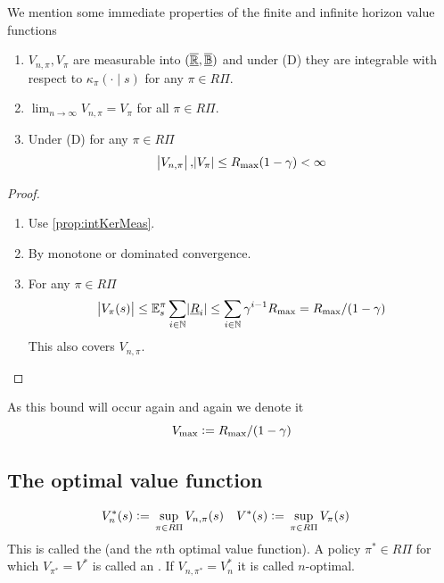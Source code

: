 We mention some immediate properties of the finite and infinite horizon
value functions
\begin{prop}
  \leavevmode
  \begin{enumerate}
    \item $V_{n,\pi}, V_\pi$ are measurable
      into $(\underline{\overline{\mathbb{R}}}, \underline{\overline{\mathbb{B}}})$
      and under (D) they are integrable with respect to $\kappa_\pi(\cdot \mid s)$
      for any $\pi \in R\Pi$.
    \item $\lim_{n\to\infty} V_{n, \pi} = V_\pi $
      for all $\pi \in R\Pi$.
    \item Under (D) for any $\pi \in R\Pi$
      \[\abs{V_{n,\pi}}, \abs{V_\pi} \leq R_{\max} (1 - \gamma) < \infty\]
  \end{enumerate}
  \label{prop:VpiMeas}
\end{prop}
\begin{proof}  
  \leavevmode
  \begin{enumerate}
    \item Use \cref{prop:intKerMeas}.
    \item By monotone or dominated convergence.
    \item For any $\pi \in R\Pi$
      \[ \abs{V_\pi(s)} \leq \mathbb{E}_s^\pi \sum_{i \in \mathbb{N}} \abs{\underline{R}_i}
	\leq \sum_{i \in \mathbb{N}} \gamma^{i-1} R_{\max}
      = R_{\max} / (1-\gamma) \]
      This also covers $V_{n, \pi}$.
  \end{enumerate}
\end{proof}

\begin{rem}
  As this bound will occur again and again we denote it
  \begin{equation}
    V_{\max} \vcentcolon= R_{\max}/(1-\gamma)
    \label{eq:VmaxDef}
  \end{equation}
\end{rem}

\subsection{The optimal value function}

\begin{defn} 
  \begin{align*}
    V_n^*(s) \vcentcolon= & \; \sup_{\pi \in R\Pi} V_{n,\pi}(s) &
    V^*(s) \vcentcolon= & \; \sup_{\pi \in R\Pi} V_\pi(s)
  \end{align*}
  This is called the  (and the $n$th
  optimal value function).
  A policy $\pi^* \in R\Pi$ for which $V_{\pi^*} = V^*$ is called an
  .
  If $V_{n, \pi^*} = V^*_n$ it is called $n$-optimal.
  \label{defn:optimalValue}
\end{defn}

